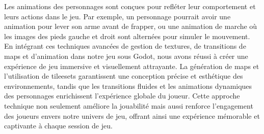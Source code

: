 Les animations des personnages sont conçues pour refléter leur comportement et leurs actions dans le jeu. Par exemple, 
un personnage pourrait avoir une animation pour lever son arme avant de frapper, ou une animation de marche 
où les images des pieds gauche et droit sont alternées pour simuler le mouvement.
\\

En intégrant ces techniques avancées de gestion de textures, de transitions de maps et d'animation dans
 notre jeu sous Godot, nous avons réussi à créer une expérience de jeu immersive et visuellement attrayante. La génération de maps et l'utilisation de 
 tileesets garantissent une conception précise et esthétique des environnements, tandis que les transitions
  fluides et les animations dynamiques des personnages enrichissent l'expérience globale du joueur. Cette approche technique non seulement 
  améliore la jouabilité mais aussi renforce l'engagement des joueurs envers notre univers de jeu, 
offrant ainsi une expérience mémorable et captivante à chaque session de jeu.





